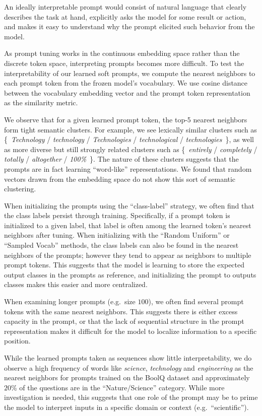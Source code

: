 An ideally interpretable prompt would consist of natural language that clearly describes the task at hand, explicitly asks the model for some result or action, and makes it easy to understand why the prompt elicited such behavior from the model.

As prompt tuning works in the continuous embedding space rather than the discrete token space, interpreting prompts becomes more difficult. To test the interpretability of our learned soft prompts, we compute the nearest neighbors to each prompt token from the frozen model's vocabulary. We use cosine distance between the vocabulary embedding vector and the prompt token representation as the similarity metric.

We observe that for a given learned prompt token, the top-5 nearest neighbors form tight semantic clusters. For example, we see lexically similar clusters such as \{~\textit{Technology} / \textit{technology} / \textit{Technologies} / \textit{technological} / \textit{technologies}~\}, as well as more diverse but still strongly related clusters such as \{~\textit{entirely} / \textit{completely} / \textit{totally} / \textit{altogether} / \textit{100\%}~\}. The nature of these clusters suggests that the prompts are in fact learning ``word-like'' representations. We found that random vectors drawn from the embedding space do not show this sort of semantic clustering.

When initializing the prompts using the ``class-label'' strategy, we often find that the class labels persist through training. Specifically, if a prompt token is initialized to a given label, that label is often among the learned token's nearest neighbors after tuning. When initializing with the ``Random Uniform'' or ``Sampled Vocab'' methods, the class labels can also be found in the nearest neighbors of the prompts; however they tend to appear as neighbors to multiple prompt tokens. This suggests that the model is learning to store the expected output classes in the prompts as reference, and initializing the prompt to outputs classes makes this easier and more centralized.

When examining longer prompts (e.g.~size $100$), we often find several prompt tokens with the same nearest neighbors. This suggests there is either excess capacity in the prompt, or that the lack of sequential structure in the prompt representation makes it difficult for the model to localize information to a specific position.

While the learned prompts taken as sequences show little interpretability, we do observe a high frequency of words like \textit{science}, \textit{technology} and \textit{engineering} as the nearest neighbors for prompts trained on the BoolQ dataset and approximately $20$\% of the questions are in the ``Nature/Science'' category. While more investigation is needed, this suggests that one role of the prompt may be to prime the model to interpret inputs in a specific domain or context (e.g.~``scientific'').

